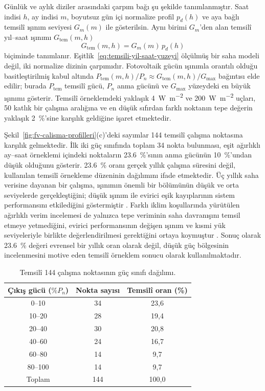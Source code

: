 Günlük ve aylık diziler arasındaki çarpım bağı şu şekilde tanımlanmıştır. Saat indisi $h$, ay indisi $m$, boyutsuz gün içi normalize profil $p_d(h)$ ve aya bağlı temsilî ışınım seviyesi $G_m(m)$ ile gösterilsin. Aynı birimi $G_m$'den alan temsilî yıl--saat ışınımı $G_{\mathrm{tem}}(m,h)$
\begin{equation}
G_{\mathrm{tem}}(m,h)=G_m(m)\,p_d(h)
\label{eq:temsili-yil-saat-yuzeyi}
\end{equation}
biçiminde tanımlanır. Eşitlik~\eqref{eq:temsili-yil-saat-yuzeyi} ölçülmüş bir saha modeli değil, iki normalize dizinin çarpımıdır. Fotovoltaik gücün ışınımla orantılı olduğu basitleştirilmiş kabul altında $P_{\mathrm{tem}}(m,h)/P_n\approx G_{\mathrm{tem}}(m,h)/G_{\max}$ bağıntısı elde edilir; burada $P_{\mathrm{tem}}$ temsilî gücü, $P_n$ anma gücünü ve $G_{\max}$ yüzeydeki en büyük ışınımı gösterir. Temsilî örneklemdeki yaklaşık \SI{4}{\watt\per\metre\squared} ve \SI{200}{\watt\per\metre\squared} uçları, 50 katlık bir çalışma aralığına ve en düşük sıfırdan farklı noktanın tepe değerin yaklaşık \SI{2}{\percent}'sine karşılık geldiğine işaret etmektedir.

Şekil~\ref{fig:fv-calisma-profilleri}(c)'deki sayımlar 144 temsilî çalışma noktasına karşılık gelmektedir. İlk iki güç sınıfında toplam 34 nokta bulunması, eşit ağırlıklı ay--saat örneklemi içindeki noktaların \SI{23.6}{\percent}'sının anma gücünün \SI{10}{\percent}'undan düşük olduğunu gösterir. \SI{23.6}{\percent} oranı gerçek yıllık çalışma süresini değil, kullanılan temsilî örnekleme düzeninin dağılımını ifade etmektedir. Üç yıllık saha verisine dayanan bir çalışma, ışınımın önemli bir bölümünün düşük ve orta seviyelerde gerçekleştiğini; düşük ışınım ile evirici eşik kayıplarının sistem performansını etkilediğini göstermiştir \citep{Mondol2007}. Farklı iklim koşullarında yürütülen ağırlıklı verim incelemesi de yalnızca tepe veriminin saha davranışını temsil etmeye yetmediğini, evirici performansının değişen ışınım ve kısmi yük seviyeleriyle birlikte değerlendirilmesi gerektiğini ortaya koymuştur \citep{AbRahman2020}. Sonuç olarak \SI{23.6}{\percent} değeri evrensel bir yıllık oran olarak değil, düşük güç bölgesinin incelenmesini motive eden temsilî örneklem sonucu olarak kullanılmaktadır.

\begin{table}[htbp]
  \centering
  \caption{Temsilî 144 çalışma noktasının güç sınıfı dağılımı.}
  \label{tab:fv-guc-dagilimi}
  \begin{tabular}{ccc}
    \toprule
    \textbf{Çıkış gücü ($\%P_n$)} & \textbf{Nokta sayısı} & \textbf{Temsilî oran (\%)} \\
    \midrule
    0--10 & 34 & 23,6 \\
    10--20 & 28 & 19,4 \\
    20--40 & 30 & 20,8 \\
    40--60 & 24 & 16,7 \\
    60--80 & 14 & 9,7 \\
    80--100 & 14 & 9,7 \\
    \midrule
    Toplam & 144 & 100,0 \\
    \bottomrule
  \end{tabular}
\end{table}

